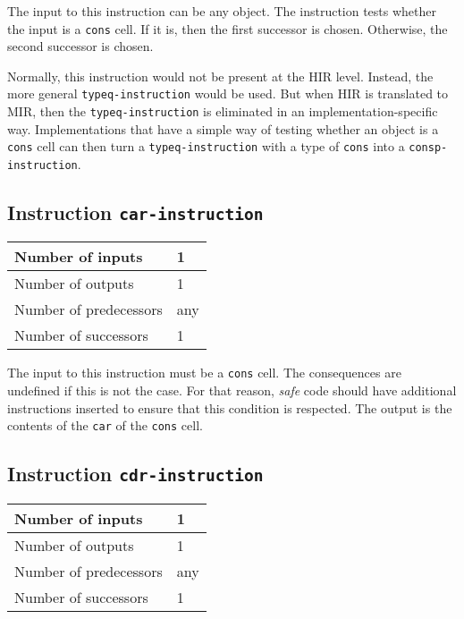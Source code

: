 The input to this instruction can be any object.  The instruction
tests whether the input is a \texttt{cons} cell.  If it is, then the
first successor is chosen.  Otherwise, the second successor is chosen.

Normally, this instruction would not be present at the HIR level.
Instead, the more general \texttt{typeq-instruction}
 would be used.  But when HIR is
translated to MIR, then the \texttt{typeq-instruction} is eliminated
in an implementation-specific way.  Implementations that have a simple
way of testing whether an object is a \texttt{cons} cell can then turn
a \texttt{typeq-instruction} with a type of \texttt{cons} into a
\texttt{consp-instruction}.

\subsection{Instruction \texttt{car-instruction}}
\label{hir-instruction-car}

\begin{tabular}{|l|l|}
\hline
Number of inputs & 1\\
\hline
Number of outputs & 1\\
\hline
Number of predecessors & any\\
\hline
Number of successors & 1\\
\hline
\end{tabular}

The input to this instruction must be a \texttt{cons} cell. The
consequences are undefined if this is not the case.  For that reason,
\emph{safe} code should have additional instructions inserted to
ensure that this condition is respected.  The output is the contents
of the \texttt{car} of the \texttt{cons} cell.

\subsection{Instruction \texttt{cdr-instruction}}
\label{hir-instruction-cdr}

\begin{tabular}{|l|l|}
\hline
Number of inputs & 1\\
\hline
Number of outputs & 1\\
\hline
Number of predecessors & any\\
\hline
Number of successors & 1\\
\hline
\end{tabular}

